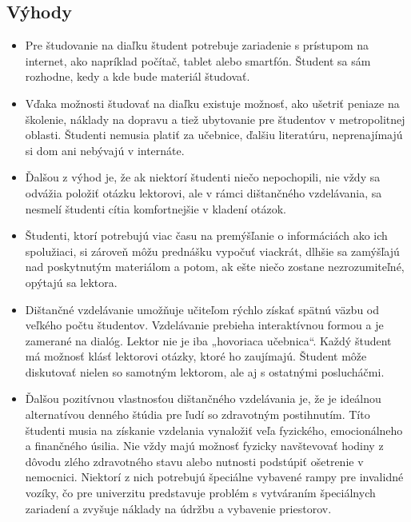 \documentclass[10pt,oneside,slovak,a4paper]{article}
\begin{document}
\subsection{Výhody}
\begin{itemize}
	\item Pre študovanie na diaľku študent potrebuje zariadenie s prístupom na internet, ako napríklad počítač, tablet alebo smartfón. Študent sa sám rozhodne, kedy a kde bude materiál študovať.
	\item Vďaka možnosti študovať na diaľku existuje možnosť, ako ušetriť peniaze na školenie, náklady na dopravu a tiež ubytovanie pre študentov v metropolitnej oblasti. Študenti nemusia platiť za učebnice, ďalšiu literatúru, neprenajímajú si dom ani nebývajú v internáte.
	\item Ďalšou z výhod je, že ak niektorí študenti niečo nepochopili, nie vždy sa odvážia položiť otázku lektorovi, ale v rámci dištančného vzdelávania, sa nesmelí študenti cítia komfortnejšie v kladení otázok. 
	\item Študenti, ktorí potrebujú viac času na premýšľanie o informáciách ako ich spolužiaci, si zároveň môžu prednášku vypočuť viackrát, dlhšie sa zamýšľajú nad poskytnutým materiálom a potom, ak ešte niečo zostane nezrozumiteľné, opýtajú sa lektora.
	\item Dištančné vzdelávanie umožňuje učiteľom rýchlo získať spätnú väzbu od veľkého počtu študentov. Vzdelávanie prebieha interaktívnou formou a je zamerané na dialóg. Lektor nie je iba „hovoriaca učebnica“. Každý študent má možnosť klásť lektorovi otázky, ktoré ho zaujímajú. Študent môže diskutovať nielen so samotným lektorom, ale aj s ostatnými poslucháčmi.
	\item Ďalšou pozitívnou vlastnosťou dištančného vzdelávania je, že je ideálnou alternatívou denného štúdia pre ľudí so zdravotným postihnutím. Títo študenti musia na získanie vzdelania vynaložiť veľa fyzického, emocionálneho a finančného úsilia. Nie vždy majú možnosť fyzicky navštevovať hodiny z dôvodu zlého zdravotného stavu alebo nutnosti podstúpiť ošetrenie v nemocnici. Niektorí z nich potrebujú špeciálne vybavené rampy pre invalidné vozíky, čo pre univerzitu predstavuje problém s vytváraním špeciálnych zariadení a zvyšuje náklady na údržbu a vybavenie priestorov.
\end{itemize}
\end{document}
